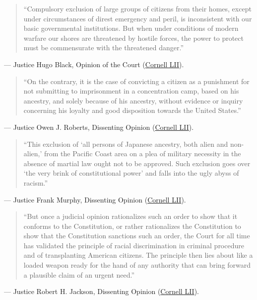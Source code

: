 \documentclass[12pt]{article}
\begin{document}
\begin{quote}
``Compulsory exclusion of large groups of citizens from their homes, except under circumstances of direst emergency and peril, is inconsistent with our basic governmental institutions. But when under conditions of modern warfare our shores are threatened by hostile forces, the power to protect must be commensurate with the threatened danger.''
\end{quote}
\noindent --- Justice Hugo Black, Opinion of the Court (\href{https://www.law.cornell.edu/supremecourt/text/323/214}{Cornell LII}).

\begin{quote}
``On the contrary, it is the case of convicting a citizen as a punishment for not submitting to imprisonment in a concentration camp, based on his ancestry, and solely because of his ancestry, without evidence or inquiry concerning his loyalty and good disposition towards the United States.''
\end{quote}
\noindent --- Justice Owen J. Roberts, Dissenting Opinion (\href{https://www.law.cornell.edu/supremecourt/text/323/214}{Cornell LII}).

\begin{quote}
``This exclusion of `all persons of Japanese ancestry, both alien and non-alien,' from the Pacific Coast area on a plea of military necessity in the absence of martial law ought not to be approved. Such exclusion goes over `the very brink of constitutional power' and falls into the ugly abyss of racism.''
\end{quote}
\noindent --- Justice Frank Murphy, Dissenting Opinion (\href{https://www.law.cornell.edu/supremecourt/text/323/214}{Cornell LII}).

\begin{quote}
``But once a judicial opinion rationalizes such an order to show that it conforms to the Constitution, or rather rationalizes the Constitution to show that the Constitution sanctions such an order, the Court for all time has validated the principle of racial discrimination in criminal procedure and of transplanting American citizens. The principle then lies about like a loaded weapon ready for the hand of any authority that can bring forward a plausible claim of an urgent need.''
\end{quote}
\noindent --- Justice Robert H. Jackson, Dissenting Opinion (\href{https://www.law.cornell.edu/supremecourt/text/323/214}{Cornell LII}).
\end{document}
